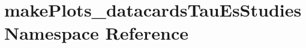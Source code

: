\hypertarget{namespacemakePlots__datacardsTauEsStudies}{
\section{makePlots\_\-datacardsTauEsStudies Namespace Reference}
\label{namespacemakePlots__datacardsTauEsStudies}
}
